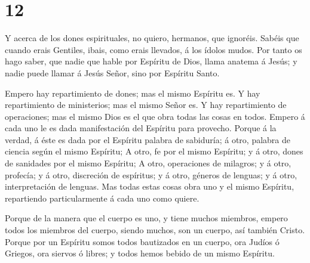 \hypertarget{section-11}{%
\section{12}\label{section-11}}

 Y acerca de los dones espirituales, no quiero, hermanos,
que ignoréis.  Sabéis que cuando erais Gentiles, ibais, como
erais llevados, á los ídolos mudos.  Por tanto os hago
saber, que nadie que hable por Espíritu de Dios, llama anatema á Jesús;
y nadie puede llamar á Jesús Señor, sino por Espíritu Santo.

 Empero hay repartimiento de dones; mas el mismo Espíritu
es.  Y hay repartimiento de ministerios; mas el mismo Señor
es.  Y hay repartimiento de operaciones; mas el mismo Dios
es el que obra todas las cosas en todos.  Empero á cada uno
le es dada manifestación del Espíritu para provecho.  Porque
á la verdad, á éste es dada por el Espíritu palabra de sabiduría; á
otro, palabra de ciencia según el mismo Espíritu;  A otro,
fe por el mismo Espíritu; y á otro, dones de sanidades por el mismo
Espíritu;  A otro, operaciones de milagros; y á otro,
profecía; y á otro, discreción de espíritus; y á otro, géneros de
lenguas; y á otro, interpretación de lenguas.  Mas todas
estas cosas obra uno y el mismo Espíritu, repartiendo particularmente á
cada uno como quiere.

 Porque de la manera que el cuerpo es uno, y tiene muchos
miembros, empero todos los miembros del cuerpo, siendo muchos, son un
cuerpo, así también Cristo.  Porque por un Espíritu somos
todos bautizados en un cuerpo, ora Judíos ó Griegos, ora siervos ó
libres; y todos hemos bebido de un mismo Espíritu.

